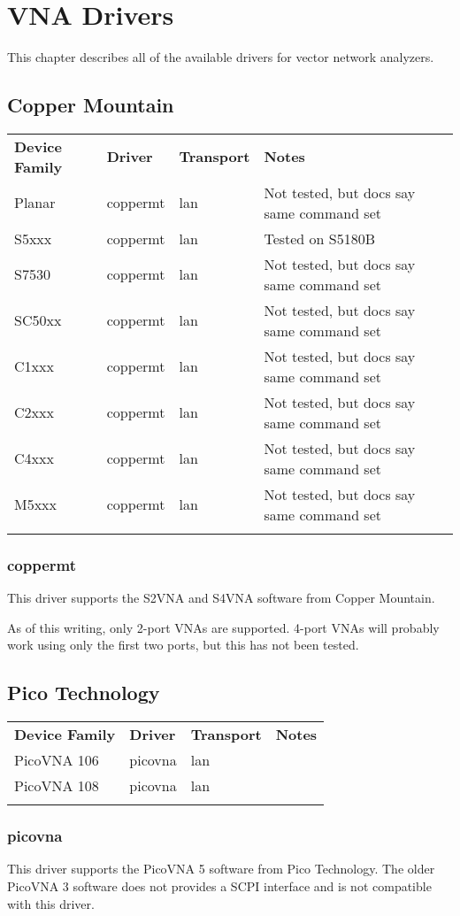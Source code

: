 \chapter{VNA Drivers}
\label{sec:vna-drivers}

This chapter describes all of the available drivers for vector network analyzers.

\section{Copper Mountain}

\begin{tabularx}{16cm}{lllX}
\thickhline
\textbf{Device Family} & \textbf{Driver} & \textbf{Transport} & \textbf{Notes} \\
\thickhline
Planar & coppermt & lan & Not tested, but docs say same command set \\
S5xxx  & coppermt & lan & Tested on S5180B \\
S7530 & coppermt & lan & Not tested, but docs say same command set \\
SC50xx & coppermt & lan & Not tested, but docs say same command set \\
C1xxx & coppermt & lan & Not tested, but docs say same command set \\
C2xxx & coppermt & lan & Not tested, but docs say same command set \\
C4xxx & coppermt & lan & Not tested, but docs say same command set \\
M5xxx & coppermt & lan & Not tested, but docs say same command set \\
\thickhline
\end{tabularx}

\subsection{coppermt}

This driver supports the S2VNA and S4VNA software from Copper Mountain.

As of this writing, only 2-port VNAs are supported. 4-port VNAs will probably work using only the first two ports,
but this has not been tested.

\section{Pico Technology}

\begin{tabularx}{16cm}{lllX}
\thickhline
\textbf{Device Family} & \textbf{Driver} & \textbf{Transport} & \textbf{Notes} \\
\thickhline
PicoVNA 106 & picovna & lan & \\
PicoVNA 108 & picovna & lan & \\
\thickhline
\end{tabularx}

\subsection{picovna}

This driver supports the PicoVNA 5 software from Pico Technology. The older PicoVNA 3 software does not provides a SCPI
interface and is not compatible with this driver.
